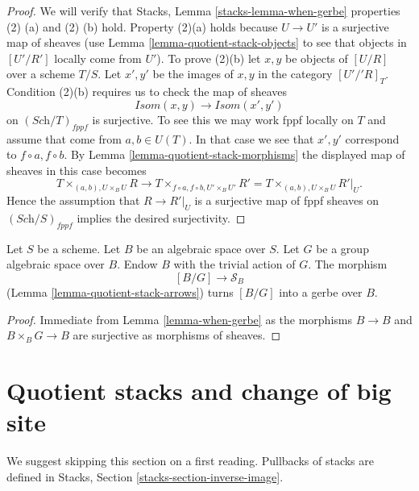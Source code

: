 \begin{proof}
We will verify that
Stacks, Lemma \ref{stacks-lemma-when-gerbe}
properties (2) (a) and (2) (b) hold. Property (2)(a) holds because $U \to U'$
is a surjective map of sheaves (use
Lemma \ref{lemma-quotient-stack-objects}
to see that objects in $[U'/R']$ locally come from $U'$).
To prove (2)(b) let $x, y$ be objects of $[U/R]$ over a scheme $T/S$.
Let $x', y'$ be the images of $x, y$ in the category $[U'/'R]_T$.
Condition (2)(b) requires us to check the map of sheaves
$$
\mathit{Isom}(x, y) \longrightarrow \mathit{Isom}(x', y')
$$
on $(\textit{Sch}/T)_{fppf}$ is surjective. To see this we may work
fppf locally on $T$ and assume that come from $a, b \in U(T)$.
In that case we see that $x', y'$ correspond to $f \circ a, f \circ b$. By
Lemma \ref{lemma-quotient-stack-morphisms}
the displayed map of sheaves in this case becomes
$$
T \times_{(a, b), U \times_B U} R
\longrightarrow
T \times_{f \circ a, f \circ b, U' \times_B U'} R' =
T \times_{(a, b), U \times_B U} R'|_U.
$$
Hence the assumption that $R \to R'|_U$ is a surjective map of fppf sheaves
on $(\textit{Sch}/S)_{fppf}$ implies the desired surjectivity.
\end{proof}

\begin{lemma}
\label{lemma-group-quotient-gerbe}
Let $S$ be a scheme. Let $B$ be an algebraic space over $S$. Let
$G$ be a group algebraic space over $B$. Endow $B$ with the trivial
action of $G$. The morphism
$$
[B/G] \longrightarrow \mathcal{S}_B
$$
(Lemma \ref{lemma-quotient-stack-arrows})
turns $[B/G]$ into a gerbe over $B$.
\end{lemma}

\begin{proof}
Immediate from
Lemma \ref{lemma-when-gerbe}
as the morphisms $B \to B$ and $B \times_B G \to B$ are surjective
as morphisms of sheaves.
\end{proof}








\section{Quotient stacks and change of big site}
\label{section-bigger-site}

\noindent
We suggest skipping this section on a first reading.
Pullbacks of stacks are defined in
Stacks, Section \ref{stacks-section-inverse-image}.

